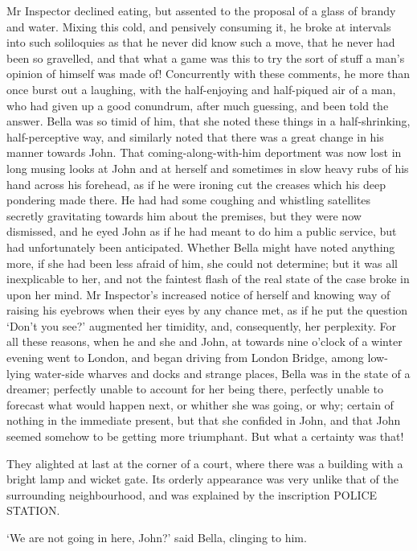 Mr Inspector declined eating, but assented to the proposal of a glass of
brandy and water. Mixing this cold, and pensively consuming it, he broke
at intervals into such soliloquies as that he never did know such a
move, that he never had been so gravelled, and that what a game was
this to try the sort of stuff a man’s opinion of himself was made
of! Concurrently with these comments, he more than once burst out a
laughing, with the half-enjoying and half-piqued air of a man, who
had given up a good conundrum, after much guessing, and been told the
answer. Bella was so timid of him, that she noted these things in a
half-shrinking, half-perceptive way, and similarly noted that there was
a great change in his manner towards John. That coming-along-with-him
deportment was now lost in long musing looks at John and at herself and
sometimes in slow heavy rubs of his hand across his forehead, as if he
were ironing cut the creases which his deep pondering made there. He had
had some coughing and whistling satellites secretly gravitating towards
him about the premises, but they were now dismissed, and he eyed John as
if he had meant to do him a public service, but had unfortunately been
anticipated. Whether Bella might have noted anything more, if she
had been less afraid of him, she could not determine; but it was all
inexplicable to her, and not the faintest flash of the real state of the
case broke in upon her mind. Mr Inspector’s increased notice of herself
and knowing way of raising his eyebrows when their eyes by any chance
met, as if he put the question ‘Don’t you see?’ augmented her timidity,
and, consequently, her perplexity. For all these reasons, when he
and she and John, at towards nine o’clock of a winter evening went to
London, and began driving from London Bridge, among low-lying water-side
wharves and docks and strange places, Bella was in the state of a
dreamer; perfectly unable to account for her being there, perfectly
unable to forecast what would happen next, or whither she was going, or
why; certain of nothing in the immediate present, but that she confided
in John, and that John seemed somehow to be getting more triumphant. But
what a certainty was that!

They alighted at last at the corner of a court, where there was a
building with a bright lamp and wicket gate. Its orderly appearance was
very unlike that of the surrounding neighbourhood, and was explained by
the inscription POLICE STATION.

‘We are not going in here, John?’ said Bella, clinging to him.

